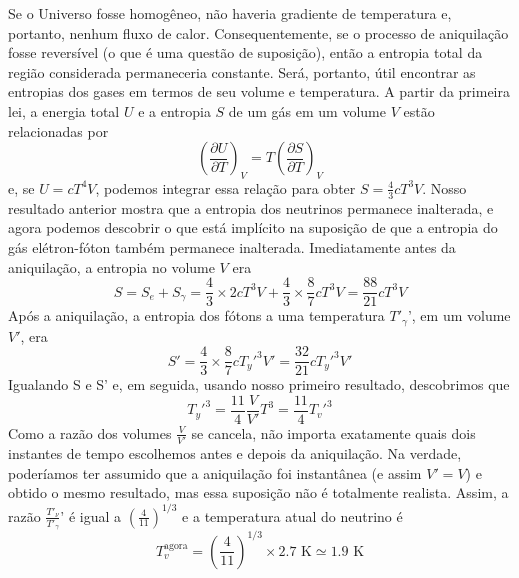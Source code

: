 \documentclass[12pt]{article}
\begin{document}
\begin{itemize}
Se o Universo fosse homogêneo, não haveria gradiente de temperatura e, portanto, nenhum fluxo de calor. Consequentemente, se o processo de aniquilação fosse reversível (o que é uma questão de suposição), então a entropia total da região considerada permaneceria constante. Será, portanto, útil encontrar as entropias dos gases em termos de seu volume e temperatura. A partir da primeira lei, a energia total $U$ e a entropia $S$ de um gás em um volume $V$ estão relacionadas por 
\[
\left( \frac{\partial U}{\partial T} \right)_V = T \left( \frac{\partial S}{\partial T} \right)_V
\]
 e, se $U = cT^4V$, podemos integrar essa relação para obter $ S = \frac{4}{3}cT^3V$. Nosso resultado anterior mostra que a entropia dos neutrinos permanece inalterada, e agora podemos descobrir o que está implícito na suposição de que a entropia do gás elétron-fóton também permanece inalterada. Imediatamente antes da aniquilação, a entropia no volume $V$ era
\[
S = S_e + S_\gamma = \frac{4}{3} \times 2cT^3V + \frac{4}{3} \times \frac{8}{7} cT^3V = \frac{88}{21} cT^3V
\]
 Após a aniquilação, a entropia dos fótons a uma temperatura $T'_\gamma$', em um volume $V'$, era 
 \[
 S' = \frac{4}{3} \times \frac{8}{7} c T_y'^3 V' = \frac{32}{21} c T_y'^3 V'
 \]
 Igualando S e S' e, em seguida, usando nosso primeiro resultado, descobrimos que 
 \[
 T_y'^3 = \frac{11}{4} \frac{V}{V'} T^3 = \frac{11}{4} T_v'^3
 \]
Como a razão dos volumes $\frac{V}{V'}$ se cancela, não importa exatamente quais dois instantes de tempo escolhemos antes e depois da aniquilação. Na verdade, poderíamos ter assumido que a aniquilação foi instantânea (e assim $V' = V$) e obtido o mesmo resultado, mas essa suposição não é totalmente realista. Assim, a razão $\frac{T'_\nu}{T'_\gamma}$' é igual a $\left( \frac{4}{11} \right)^{1/3}$ e a temperatura atual do neutrino é 
\[
T_v^\text{agora} = \left( \frac{4}{11} \right)^{1/3} \times 2.7 \text{ K} \simeq 1.9 \text{ K}
\]
 \end{itemize}
\end{document}

